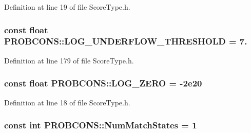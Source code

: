 Definition at line 19 of file Score\+Type.\+h.

\hypertarget{namespace_p_r_o_b_c_o_n_s_acbc36709b1c9a80fa2ec8ead6e1a73ee}{
\subsubsection[{L\+O\+G\+\_\+\+U\+N\+D\+E\+R\+F\+L\+O\+W\+\_\+\+T\+H\+R\+E\+S\+H\+O\+L\+D}]{\setlength{\rightskip}{0pt plus 5cm}const float P\+R\+O\+B\+C\+O\+N\+S\+::\+L\+O\+G\+\_\+\+U\+N\+D\+E\+R\+F\+L\+O\+W\+\_\+\+T\+H\+R\+E\+S\+H\+O\+L\+D = 7.}}\label{namespace_p_r_o_b_c_o_n_s_acbc36709b1c9a80fa2ec8ead6e1a73ee}


Definition at line 179 of file Score\+Type.\+h.

\hypertarget{namespace_p_r_o_b_c_o_n_s_ae5514101b91c6ae08ed2ee9306d2305d}{
\subsubsection[{L\+O\+G\+\_\+\+Z\+E\+R\+O}]{\setlength{\rightskip}{0pt plus 5cm}const float P\+R\+O\+B\+C\+O\+N\+S\+::\+L\+O\+G\+\_\+\+Z\+E\+R\+O = -\/2e20}}\label{namespace_p_r_o_b_c_o_n_s_ae5514101b91c6ae08ed2ee9306d2305d}


Definition at line 18 of file Score\+Type.\+h.

\hypertarget{namespace_p_r_o_b_c_o_n_s_a1ce3646341e8ca6190adcf1ae31e1cb6}{
\subsubsection[{Num\+Match\+States}]{\setlength{\rightskip}{0pt plus 5cm}const int P\+R\+O\+B\+C\+O\+N\+S\+::\+Num\+Match\+States = 1}}\label{namespace_p_r_o_b_c_o_n_s_a1ce3646341e8ca6190adcf1ae31e1cb6}


